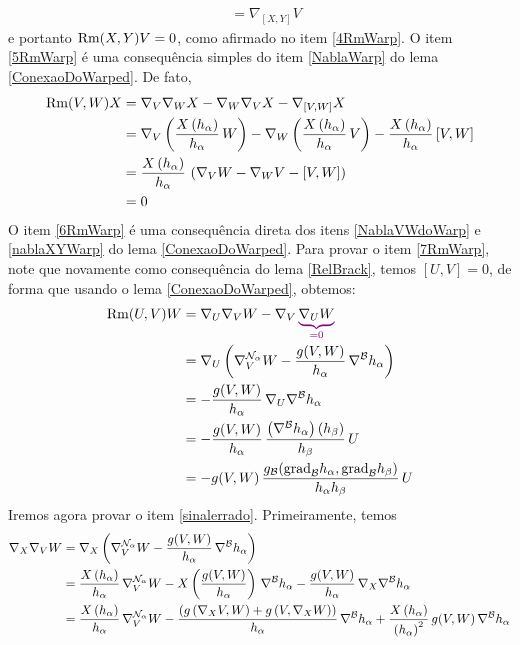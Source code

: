 \begin{demm}
\begin{align*}
&= \nabla_{[X, Y]} V
\end{align*}
e portanto $\mathrm{Rm}(X, Y)V =0$, como afirmado no item \ref{4RmWarp}. O item \ref{5RmWarp} é uma consequência simples do item \ref{NablaWarp} do lema \cref{ConexaoDoWarped}. De fato, 
\begin{align*}
\mathrm{Rm}(V, W)X &= \nabla_V \nabla_W X - \nabla_W \nabla_V X - \nabla_{[V,W]}X \\
&= \nabla_V \left(  \frac{X\left( h_{\alpha} \right)}{h_\alpha} \, W \right) - \nabla_W \left(  \frac{X\left( h_{\alpha} \right)}{h_\alpha} \, V \right) - \frac{X\left( h_{\alpha} \right)}{h_\alpha} \, [V, W] \\
&= \frac{X\left( h_{\alpha} \right)}{h_\alpha} \, \left(  \nabla_V W - \nabla_W V - [V, W]  \right) \\
&=0
\end{align*} 
O item \ref{6RmWarp} é uma consequência direta dos itens \ref{NablaVWdoWarp} e \ref{nablaXYWarp} do lema \cref{ConexaoDoWarped}. Para provar o item \ref{7RmWarp}, note que novamente como consequência do lema \cref{RelBrack}, temos $[U, V] = 0$, de forma que usando o lema \cref{ConexaoDoWarped}, obtemos:
\begin{align*}
\Rm(U, V)W &= \cn_U \cn_V W - \cn_V \Munderbrace{\cn_U W}{=0} \\
&=\cn_U \left( \cn^{\nn_{\alpha}}_V W - \frac{g(V, W)}{h_{\alpha}} \, \cn^{\bb} h_{\alpha} \right) \\
&= -\frac{g(V, W)}{h_{\alpha}} \, \cn_U \cn^{\bb} h_{\alpha} \\
&= -\frac{g(V, W)}{h_{\alpha}} \, \frac{\parent{ \cn^{\bb} h_{\alpha} } \parent{h_{\beta}}}{h_{\beta}} \, U \\
&= -g(V, W) \, \frac{g_{\bb}(\grad_{\bb} h_{\alpha}, \grad_{\bb} h_{\beta})}{h_{\alpha} h_{\beta}} \, U
\end{align*}
Iremos agora provar o item \ref{sinalerrado}. Primeiramente, temos
\begin{align*}
\cn_X \cn_V W &= \cn_X \parent{\cn^{\nn_{\alpha}}_{V} W - \frac{g(V, W)}{h_{{\alpha}} } \,  \cn^{\bb} h_{\alpha} } \\
&= \frac{X\parent{ h_{\alpha}}}{h_{\alpha}} \, \cn^{\nn_{\alpha}}_{V} W - X \parent{ \frac{g(V, W)}{h_{\alpha}} } \, \cn^{\bb} h_{\alpha} -  \frac{g(V, W)}{h_{\alpha}} \, \cn_X \cn^{\bb} h_{\alpha} \\
&= \frac{X\parent{ h_{\alpha}}}{h_{\alpha}} \, \cn^{\nn_{\alpha}}_{V} W - \frac{\parent{  g\parent{\nabla_X V, W   } +  g\parent{V, \nabla_X W   }    }}{h_{\alpha}} \, \nabla^{\bb} h_{\alpha} + \frac{X \parent{h_{\alpha}}   }{\parent{h_{\alpha}}^2} \, g(V, W) \, \cn^{\bb} h_{\alpha} \\

\end{align*}
\end{demm}
